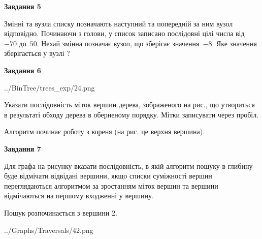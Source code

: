 \documentclass[12pt, ukrainian]{article}
\begin{document}
{\begin {large}
{\begin {center}\textbf{Завдання 5}\end {center}}\par
Змінні  та  вузла списку позначають наступний та попередній за ним вузол відповідно. Починаючи з голови, у список записано послідовні цілі числа від~$-70$ до~$50$. Нехай змінна  позначає вузол, що зберігає значення~$-8$.
Яке значення зберігається у вузлі  ?\par
\newpage

{\begin {center}\textbf{Завдання 6}\end {center}}\par

\begin{center}
	{../BinTree/trees_exp/24.png}
\end{center}
Указати послідовність міток вершин дерева, зображеного на рис., що утвориться в результаті обходу дерева в оберненому порядку. Мітки записувати через пробіл.\par Алгоритм починає роботу з кореня (на рис. це верхня вершина).\par
\newpage

{\begin {center}\textbf{Завдання 7}\end {center}}\par
Для графа на рисунку вказати послідовність, в якій алгоритм пошуку в глибину буде відмічати відвідані вершини, якщо списки суміжності вершин переглядаються алгоритмом за зростанням міток вершин та вершини відмічаються на першому вход\-женні у вершину.\par
Пошук розпочинається з вершини 2.\par

\begin{center}
	{../Graphs/Traversals/42.png}
\end{center}\par
\newpage


\end{large}}
\end{document}
